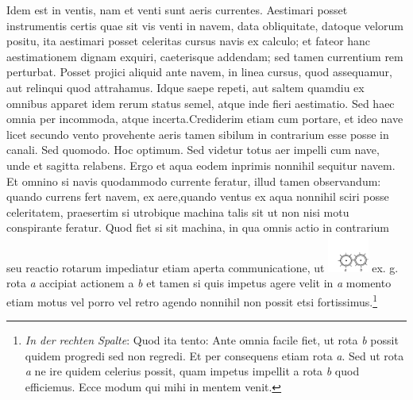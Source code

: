 Idem est in ventis, nam et venti sunt aeris currentes. Aestimari posset instrumentis certis quae sit vis venti in navem\protect{}, data obliquitate, datoque velorum positu, ita aestimari posset celeritas\protect{} cursus navis\protect{} ex calculo; et fateor hanc aestimationem dignam exquiri, caeterisque addendam; sed tamen currentium  rem perturbat. Posset projici aliquid ante navem\protect{}, in linea cursus, quod assequamur, aut relinqui quod attrahamus. Idque saepe repeti, aut saltem quamdiu ex omnibus apparet idem rerum status semel, atque inde fieri aestimatio. Sed haec omnia per incommoda, atque incerta.\newline Crediderim etiam cum  portare, et ideo nave\protect{} licet secundo vento provehente aeris tamen sibilum in contrarium esse posse in canali. Sed quomodo. Hoc optimum. Sed videtur totus aer impelli cum nave\protect{}, unde et sagitta relabens. Ergo et aqua eodem  inprimis nonnihil sequitur navem\protect{}. Et omnino si navis\protect{} quodammodo currente feratur, illud \hspace{1mm}tamen observandum: \hspace{1mm}quando \hspace{1mm}currens \hspace{1mm}fert \hspace{1mm}navem, ex aere,\pend\pstart\noindent\hangindent=10mm\hspace{10mm}quando ventus ex aqua nonnihil sciri posse celeritatem\protect{}, praesertim si utrobique machina talis sit ut non nisi motu conspirante feratur. Quod fiet si sit machina, in qua omnis actio in contrarium seu reactio rotarum\protect{} impediatur etiam aperta communicatione, ut \protect\includegraphics[width=0.1\textwidth]{images/38_18v2} ex. g. rota\protect{} \textit{a} accipiat actionem a \textit{b} et tamen si quis impetus agere velit in \textit{a} momento etiam motus vel porro vel retro agendo nonnihil non possit etsi fortissimus.\footnote{\textit{In der rechten Spalte}: Quod ita tento: Ante omnia facile fiet, ut rota \textit{b} possit quidem progredi sed non regredi. Et per consequens etiam rota \protect{}\textit{a}. Sed ut rota \protect{}\textit{a} ne ire quidem celerius possit, quam impetus impellit a rota \protect{}\textit{b} quod efficiemus. Ecce modum qui mihi in mentem venit.
} \pend